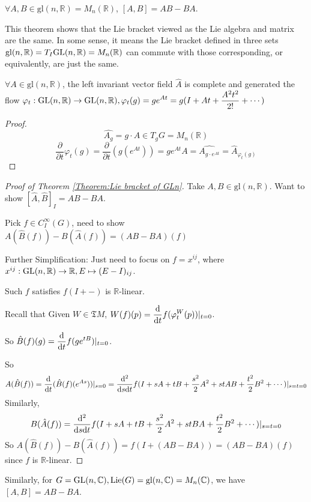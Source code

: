 \begin{theorem}\label{Theorem:Lie bracket of GLn}
     $ \forall A,B\in\mathrm{gl}(n,\mathbb{R})=M_n(\mathbb{R}) $,  $ [A,B]=AB-BA $.  
\end{theorem}
\begin{remark}
    This theorem shows that the Lie bracket viewed as the Lie algebra and matrix are the same. In some sense, it means the Lie bracket defined in three sets  $ \mathrm{gl}(n,\mathbb{R})=T_I\mathrm{GL}(n,\mathbb
    R)=M_n(\mathbb{R}) $ can commute with those corresponding, or equivalently, are just the same. 
\end{remark}
\begin{lemma}
     $ \forall A\in \mathrm{gl}(n,\mathbb{R}) $, the left invariant vector field  $ \hat{A} $ is complete and generated the flow  $ \displaystyle\varphi_t:\mathrm{GL}(n,\mathbb{R})\rightarrow \mathrm{GL}(n,\mathbb{R}), \varphi_t(g)=ge^{At}=g(I+At+\frac{A^2t^2}{2!}+\cdots) $   
\end{lemma}
\begin{proof}
     \[\hat{A_g}=g\cdot A\in T_gG=M_n(\mathbb{R})\]
      \[\frac{\partial}{\partial t}\varphi_t(g)=\frac{\partial}{\partial t}(g(e^{At}))=ge^{At}A=\hat{A_{g\cdot e^{At}}}=\hat{A}_{\varphi_t(g)}\]
\end{proof}
\begin{proof}[Proof of Theorem \ref{Theorem:Lie bracket of GLn}]
    Take  $ A,B\in \mathrm{gl}(n,\mathbb{R}) $. Want to show  $ [\hat{A},\hat{B}]_I=AB-BA $.
    
    Pick  $ f\in C^\infty_I(G) $, need to show  $ A(\hat{B}(f))-B(\hat{A}(f))=(AB-BA)(f) $
    
    Further Simplification: Just need to focus on  $ f=x^{ij} $, where  $ x^{ij}:\mathrm{GL}(n,\mathbb{R})\rightarrow \mathbb{R}, E\mapsto (E-I)_{ij} $.
    
    Such  $ f $ satisfies  $ f(I+-) $ is  $ \mathbb{R} $-linear.
    
    Recall that Given  $ W\in \mathfrak{T}M $,  $ W(f)(p)=\displaystyle\frac{\mathrm{d}}{\mathrm{d}t}f(\varphi_t^W(p))|_{t=0} $.
    
    So  $ \hat{B}(f)(g)=\displaystyle\frac{\mathrm{d}}{\mathrm{d}t}f(ge^{tB})|_{t=0} $.
    
    So  \[\displaystyle A(\hat{B}(f)) =\frac{\mathrm{d}}{\mathrm{d}t}(\hat{B}(f)(e^{As}))|_{s=0}=\frac{\mathrm{d}^2}{\mathrm{d}s\mathrm{d}t}f(I+sA+tB+\frac{s^2}{2}A^2+stAB+\frac{t^2}{2}B^2+\cdots)|_{s=t=0}\]
    Similarly,
    \[\displaystyle B(\hat{A}(f))=\frac{\mathrm{d}^2}{\mathrm{d}s\mathrm{d}t}f(I+sA+tB+\frac{s^2}{2}A^2+stBA+\frac{t^2}{2}B^2+\cdots)|_{s=t=0}\]
    So $ A(\hat{B}(f))-B(\hat{A}(f))=f(I+(AB-BA))=(AB-BA)(f) $ since  $ f $ is  $ \mathbb{R} $-linear.  
\end{proof}
Similarly, for  $ G=\mathrm{GL}(n,\mathbb{C}), \mathrm{Lie}(G)=\mathrm{gl}(n,\mathbb{C})=M_n(\mathbb{C}) $, we have  $ [A,B]=AB-BA $.
  
